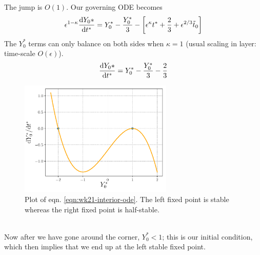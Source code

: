 The jump is $O(1)$. Our governing ODE becomes
\begin{gather}
\epsilon^{1-\kappa} \frac{\mathrm{d} Y_0\ast}{\mathrm{d} t^\ast } = Y_0^\ast - \frac{Y_0^\ast}{3} - \left[\epsilon^\kappa t^\ast + \frac{2}{3} + \epsilon^{2/3}\tilde{t}_0\right]
\end{gather}
The $Y_0^\ast$ terms can only balance on both sides when $\kappa =1$ (usual scaling in layer: time-scale $O(\epsilon)$). 
\begin{gather}
	\frac{\mathrm{d} Y_0\ast}{\mathrm{d} t^\ast } = Y_0^\ast - \frac{Y_0^\ast}{3} - \frac{2}{3} \label{eqn:wk21-interior-ode}
\end{gather}
\begin{figure}[!h]
	\centering
	\includegraphics[width=0.65\textwidth]{./plots/pdf/strogatz-wk21-interior.pdf}
	\caption{Plot of eqn. \ref{eqn:wk21-interior-ode}. The left fixed point is stable whereas the right fixed point is half-stable.}
	\label{fig:strogatz-wk21-interior}
\end{figure}\\
Now after we have gone around the corner, $Y_0^\ast<1$; this is our initial condition, which then implies that we end up at the left stable fixed point.












